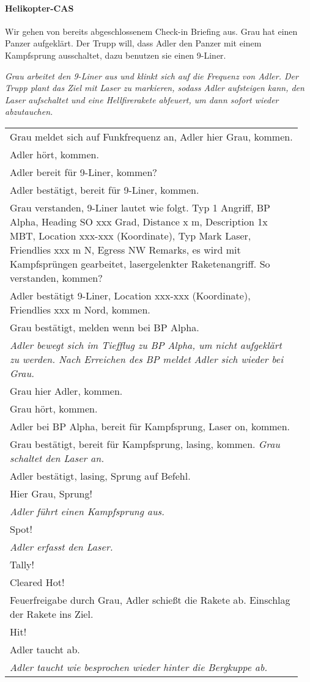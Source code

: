 \paragraph*{Helikopter-CAS}
	Wir gehen von bereits abgeschlossenem Check-in Briefing aus. Grau hat einen Panzer
	aufgeklärt. Der Trupp will, dass Adler den Panzer mit einem Kampfsprung ausschaltet,
	dazu benutzen sie einen 9-Liner.\par
	\textit{Grau arbeitet den 9-Liner aus und klinkt sich auf die Frequenz von Adler. Der Trupp plant
	das Ziel mit Laser zu markieren, sodass Adler aufsteigen kann, den Laser aufschaltet und
	eine Hellfirerakete abfeuert, um dann sofort wieder abzutauchen.}
	\begin{longtable}{P{0.95\linewidth}}
	\toprule
	Grau meldet sich auf Funkfrequenz an, Adler hier Grau, kommen.\\
	\rcg Adler hört, kommen.\\
	Adler bereit für 9-Liner, kommen?\\
	\rcg Adler bestätigt, bereit für 9-Liner, kommen.\\
	Grau verstanden, 9-Liner lautet wie folgt. Typ 1 Angriff, BP Alpha, Heading SO xxx Grad,
	Distance x m, Description 1x MBT, Location xxx-xxx (Koordinate), Typ Mark Laser,
	Friendlies xxx m N, Egress NW Remarks, es wird mit Kampfsprüngen gearbeitet,
	lasergelenkter Raketenangriff. So verstanden, kommen?\\
	\rcg Adler bestätigt 9-Liner, Location xxx-xxx (Koordinate), Friendlies xxx m Nord, kommen.\\
	Grau bestätigt, melden wenn bei BP Alpha.\\
	\rcg \textit{Adler bewegt sich im Tiefflug zu BP Alpha, um nicht aufgeklärt zu werden. Nach Erreichen des BP meldet Adler sich wieder bei Grau.}\\
	\rcg Grau hier Adler, kommen.\\
	Grau hört, kommen.\\
	\rcg Adler bei BP Alpha, bereit für Kampfsprung, Laser on, kommen.\\
	Grau bestätigt, bereit für Kampfsprung, lasing, kommen. \textit{Grau schaltet den Laser an.}\\
	\rcg Adler bestätigt, lasing, Sprung auf Befehl.\\
	Hier Grau, Sprung!\\
	\rcg \textit{Adler führt einen Kampfsprung aus.}\\
	\rcg Spot!\\
	\rcg \textit{Adler erfasst den Laser.}\\
	\rcg Tally!\\
	Cleared Hot!\\
	\rcg Feuerfreigabe durch Grau, Adler schießt die Rakete ab. Einschlag der Rakete ins Ziel.\\
	Hit!\\
	\rcg Adler taucht ab.\\
	\rcg \textit{Adler taucht wie besprochen wieder hinter die Bergkuppe ab.}\\
	\bottomrule
	\end{longtable}

